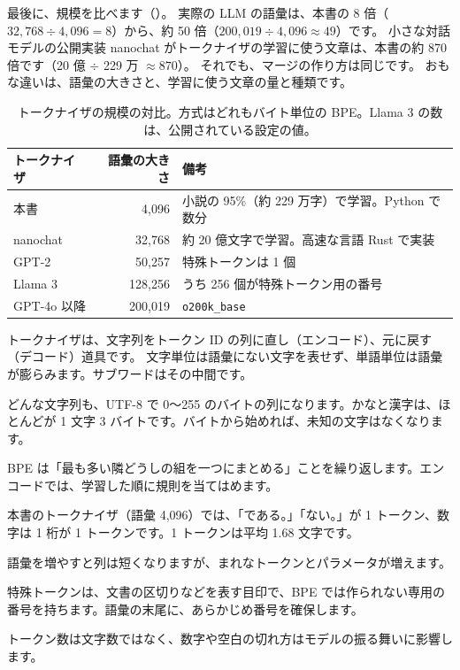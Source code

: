 最後に、規模を比べます（）。
実際の LLM の語彙は、本書の 8 倍（$32{,}768\div4{,}096=8$）から、約 50 倍（$200{,}019\div4{,}096\approx49$）です。
小さな対話モデルの公開実装 nanochat がトークナイザの学習に使う文章は、本書の約 870 倍です（20 億 $\div$ 229 万 $\approx870$）。
それでも、マージの作り方は同じです。
おもな違いは、語彙の大きさと、学習に使う文章の量と種類です。

\begin{table}[tbp]
\centering
\caption{トークナイザの規模の対比。方式はどれもバイト単位の BPE。Llama 3 の数は、公開されている設定の値。}
\label{tab:tok-scale}
\small
\begin{tabular}{lrl}
\toprule
トークナイザ & 語彙の大きさ & 備考 \\
\midrule
本書 & 4,096 & 小説の 95\%（約 229 万字）で学習。Python で数分 \\
nanochat~\cite{karpathy2025nanochat} & 32,768 & 約 20 億文字で学習。高速な言語 Rust で実装 \\
GPT-2~\cite{radford2019language} & 50,257 & 特殊トークンは 1 個 \\
Llama 3~\cite{dubey2024llama3} & 128,256 & うち 256 個が特殊トークン用の番号 \\
GPT-4o 以降 & 200,019 & \texttt{o200k\_base} \\
\bottomrule
\end{tabular}
\end{table}

\begin{summary}
\item トークナイザは、文字列をトークン ID の列に直し（エンコード）、元に戻す（デコード）道具です。
文字単位は語彙にない文字を表せず、単語単位は語彙が膨らみます。サブワードはその中間です。
\item どんな文字列も、UTF-8 で 0〜255 のバイトの列になります。かなと漢字は、ほとんどが 1 文字 3 バイトです。バイトから始めれば、未知の文字はなくなります。
\item BPE は「最も多い隣どうしの組を一つにまとめる」ことを繰り返します。エンコードでは、学習した順に規則を当てはめます。
\item 本書のトークナイザ（語彙 4,096）では、「である。」「ない。」が 1 トークン、数字は 1 桁が 1 トークンです。1 トークンは平均 1.68 文字です。
\item 語彙を増やすと列は短くなりますが、まれなトークンとパラメータが増えます。
\item 特殊トークンは、文書の区切りなどを表す目印で、BPE では作られない専用の番号を持ちます。語彙の末尾に、あらかじめ番号を確保します。
\item トークン数は文字数ではなく、数字や空白の切れ方はモデルの振る舞いに影響します。
\end{summary}

